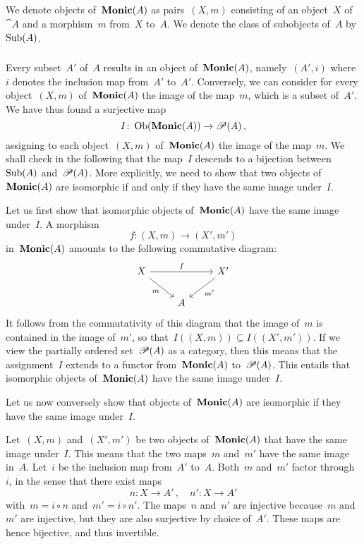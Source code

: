 \subsection{}

We denote objects of~$\mathbf{Monic}(A)$ as pairs~$(X, m)$ consisting of an object~$X$ of~$\cat{A}$ and a morphism~$m$ from~$X$ to~$A$.
We denote the class of subobjects of~$A$ by~$\operatorname{Sub}(A)$.



\subsubsection{}

Every subset~$A'$ of~$A$ results in an object of~$\mathbf{Monic}(A)$, namely~$(A', i)$ where~$i$ denotes the inclusion map from~$A'$ to~$A'$.
Conversely, we can consider for every object~$(X, m)$ of~$\mathbf{Monic}(A)$ the image of the map~$m$, which is a subset of~$A'$.
We have thus found a surjective map
\[
	I
	\colon
	\operatorname{Ob}(\mathbf{Monic}(A)) \to \mathscr{P}(A) \,,
\]
assigning to each object~$(X, m)$ of~$\mathbf{Monic}(A)$ the image of the map~$m$.
We shall check in the following that the map~$I$ descends to a bijection between~$\operatorname{Sub}(A)$ and~$\mathscr{P}(A)$.
More explicitly, we need to show that two objects of~$\mathbf{Monic}(A)$ are isomorphic if and only if they have the same image under~$I$.

Let us first show that isomorphic objects of~$\mathbf{Monic}(A)$ have the same image under~$I$.
A morphism
\[
	f \colon (X, m) \to (X', m')
\]
in~$\mathbf{Monic}(A)$ amounts to the following commutative diagram:
\[
	\begin{tikzcd}[column sep = normal]
		X
		\arrow{rr}[above]{f}
		\arrow{dr}[below left]{m}
		&
		{}
		&
		X'
		\arrow{dl}[below right]{m'}
		\\
		{}
		&
		A
		&
		{}
	\end{tikzcd}
\]
It follows from the commutativity of this diagram that the image of~$m$ is contained in the image of~$m'$, so that~$I((X, m)) ⊆ I((X', m'))$.
If we view the partially ordered set~$\mathscr{P}(A)$ as a category, then this means that the assignment~$I$ extends to a functor from~$\mathbf{Monic}(A)$ to~$\mathscr{P}(A)$.
This entails that isomorphic objects of~$\mathbf{Monic}(A)$ have the same image under~$I$.

Let us now conversely show that objects of~$\mathbf{Monic}(A)$ are isomorphic if they have the same image under~$I$.

Let~$(X, m)$ and~$(X', m')$ be two objects of~$\mathbf{Monic}(A)$ that have the same image under~$I$.
This means that the two maps~$m$ and~$m'$ have the same image in~$A$.
Let~$i$ be the inclusion map from~$A'$ to~$A$.
Both~$m$ and~$m'$ factor through~$i$, in the sense that there exist maps
\[
	n \colon X \to A' \,,
	\quad
	n' \colon X \to A'
\]
with~$m = i ∘ n$ and~$m' = i ∘ n'$.
The maps~$n$ and~$n'$ are injective because~$m$ and~$m'$ are injective, but they are also surjective by choice of~$A'$.
These maps are hence bijective, and thus invertible.

